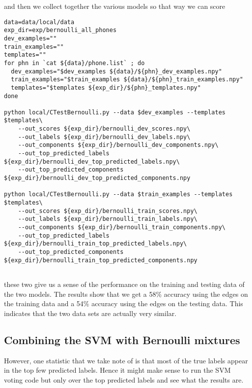 \documentclass{article}
\begin{document}
and then we collect together the various models so that way
we can score

\begin{verbatim}
data=data/local/data
exp_dir=exp/bernoulli_all_phones
dev_examples=""
train_examples=""
templates=""
for phn in `cat ${data}/phone.list` ; do
  dev_examples="$dev_examples ${data}/${phn}_dev_examples.npy"
  train_examples="$train_examples ${data}/${phn}_train_examples.npy"
  templates="$templates ${exp_dir}/${phn}_templates.npy"
done

python local/CTestBernoulli.py --data $dev_examples --templates $templates\
    --out_scores ${exp_dir}/bernoulli_dev_scores.npy\
    --out_labels ${exp_dir}/bernoulli_dev_labels.npy\
    --out_components ${exp_dir}/bernoulli_dev_components.npy\
    --out_top_predicted_labels ${exp_dir}/bernoulli_dev_top_predicted_labels.npy\
    --out_top_predicted_components ${exp_dir}/bernoulli_dev_top_predicted_components.npy

python local/CTestBernoulli.py --data $train_examples --templates $templates\
    --out_scores ${exp_dir}/bernoulli_train_scores.npy\
    --out_labels ${exp_dir}/bernoulli_train_labels.npy\
    --out_components ${exp_dir}/bernoulli_train_components.npy\
    --out_top_predicted_labels ${exp_dir}/bernoulli_train_top_predicted_labels.npy\
    --out_top_predicted_components ${exp_dir}/bernoulli_train_top_predicted_components.npy


\end{verbatim}
these two give us a sense of the performance on the training and
testing data of the two models.  The results show that we get
a 58\% accuracy using the edges on the training data and a
54\% accuracy using the edges on the testing data. This indicates
that the two data sets are actually very similar.

\subsection{Combining the SVM with Bernoulli mixtures}
However, one statistic that we take note of is that most
of the true labels appear in the top few predicted labels. 
Hence it might make sense to run the SVM voting code but only
over the top predicted labels and see what the results are.
\end{document}
